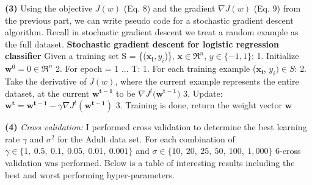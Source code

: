 \documentclass[11pt]{article}
\renewcommand\part[1]{\vspace{.10in}\textbf{(#1)}}
\begin{document}
\part{3} Using the objective $J(w)$ (Eq. 8) and the gradient $\nabla J(w)$ (Eq. 9) from the previous part, we can write pseudo code for a stochastic gradient descent algorithm. Recall in stochastic gradient descent we treat a random example as the full dataset.
\vspace{2mm} \break
{\Large \textbf{Stochastic gradient descent for logistic regression classifier}} \vspace{2mm} \break
{\large Given a training set S = \{($\mathbf{x_i}, y_i$)\}, $\mathbf{x} \in \Re^n$, $y \in \{-1, 1\}$:} \vspace{2mm} \break
{\large 1. \hspace{5mm} Initialize $\mathbf{w}^0 = 0 \in \Re^n$} \vspace{2mm} \break
{\large 2. \hspace{5mm} For epoch = 1 ... T:} \vspace{2mm} \break
{\large \hspace*{20mm} 1. For each training example ($\mathbf{x_i}$, $y_i) \in S$:} \vspace{2mm} \break
{\large \hspace*{20mm} 2. Take the derivative of $J(w)$, where the current example represents the entire}
{\large \hspace*{25mm} dataset, at the current $\mathbf{w^{t-1}}$ to be $\nabla J^t(\mathbf{w^{t-1})}$} \vspace{2mm} \break
{\large \hspace*{20mm} 3. Update: $\mathbf{w^t} = \mathbf{w^{t-1}} - \gamma \nabla J^t(\mathbf{w^{t-1}})$} \vspace{2mm} \break
{\large 3. Training is done, return the weight vector $\mathbf{w}$}

\part{4} \textit{Cross validation:} I performed cross validation to determine the best learning rate $\gamma$ and $\sigma^2$ for the Adult data set. For each combination of $\gamma \in \{1, \ 0.5, \ 0.1, \ 0.05, \ 0.01, \ 0.001\}$ and $\sigma \in \{10, \ 20, \ 25, \ 50, \ 100, \ 1,000\}$ 6-cross validation was performed. Below is a table of interesting results including the best and worst performing hyper-parameters.
\end{document}
